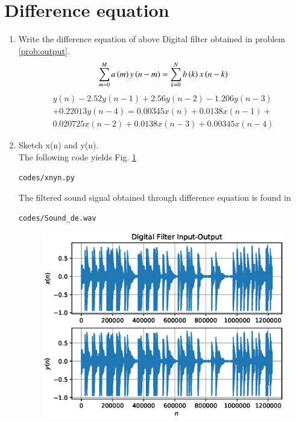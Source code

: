 \documentclass[journal,12pt,twocolumn]{IEEEtran}
\renewcommand\thesection{\arabic{section}}
\begin{document}
\section{Difference equation}
\begin{enumerate}[label=\thesection.\arabic*,ref=\thesection.\theenumi]

\item
\label{prob:diff_eq}
Write the difference equation of above Digital filter obtained in problem \ref{prob:output}.
\\
\solution
\begin{equation}
\label{eq:iir_filter_gen}
 \sum _{m=0}^{M}a\left(m\right)y\left(n-m\right)=\sum _{k=0}^{N}b\left(k\right)x\left(n-k\right)
\end{equation}
\begin{equation}
\label{eq:diff_eqn}
\begin{split}
y(n) - 2.52y(n-1) + 2.56y(n-2) - 1.206y(n-3)
\\
+ 0.22013y(n-4) = 0.00345x(n) + 0.0138x(n-1) +
\\
 0.020725x(n-2) + 0.0138x(n-3) + 0.00345x(n-4)
\end{split}
\end{equation}
\item
\label{prob:xnyn_plot1}
Sketch x(n) and y(n).
\\
\solution
The following code yields Fig. \ref{fig:xnyn}
\begin{lstlisting}
codes/xnyn.py
\end{lstlisting}
The filtered sound signal obtained through difference equation is found in
\begin{lstlisting}
codes/Sound_de.wav
\end{lstlisting}
\begin{figure}[!ht]
\begin{center}
\includegraphics[width=\columnwidth]{./figs/xnyn}
\end{center}
\label{fig:xnyn}	
\end{figure}

\end{enumerate}
\end{document}
